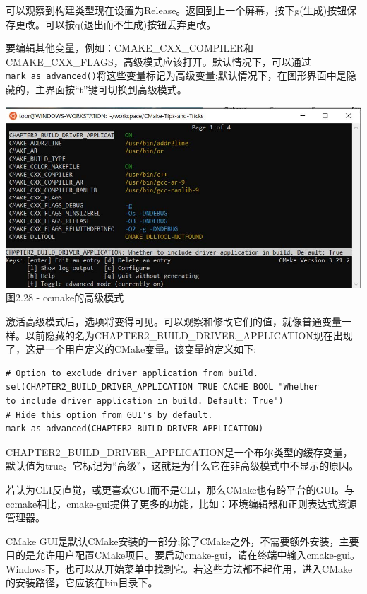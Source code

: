 可以观察到构建类型现在设置为Release。返回到上一个屏幕，按下g(生成)按钮保存更改。可以按q(退出而不生成)按钮丢弃更改。

要编辑其他变量，例如：CMAKE\_CXX\_COMPILER和CMAKE\_CXX\_FLAGS，高级模式应该打开。默认情况下，可以通过\texttt{mark\_as\_advanced()}将这些变量标记为高级变量;默认情况下，在图形界面中是隐藏的，主界面按“t”键可切换到高级模式。

\begin{center}
\includegraphics[width=1.\textwidth]{content/1/chapter2/images/28.jpg}\\
图2.28 - ccmake的高级模式
\end{center}

激活高级模式后，选项将变得可见。可以观察和修改它们的值，就像普通变量一样。以前隐藏的名为CHAPTER2\_BUILD\_DRIVER\_APPLICATION现在出现了，这是一个用户定义的CMake变量。该变量的定义如下:

\begin{lstlisting}[style=styleCMake]
# Option to exclude driver application from build.
set(CHAPTER2_BUILD_DRIVER_APPLICATION TRUE CACHE BOOL "Whether
to include driver application in build. Default: True")
# Hide this option from GUI's by default.
mark_as_advanced(CHAPTER2_BUILD_DRIVER_APPLICATION)
\end{lstlisting}

CHAPTER2\_BUILD\_DRIVER\_APPLICATION是一个布尔类型的缓存变量，默认值为true。它标记为“高级”，这就是为什么它在非高级模式中不显示的原因。


若认为CLI反直觉，或更喜欢GUI而不是CLI，那么CMake也有跨平台的GUI。与ccmake相比，cmake-gui提供了更多的功能，比如：环境编辑器和正则表达式资源管理器。

CMake GUI是默认CMake安装的一部分;除了CMake之外，不需要额外安装，主要目的是允许用户配置CMake项目。要启动cmake-gui，请在终端中输入cmake-gui。Windows下，也可以从开始菜单中找到它。若这些方法都不起作用，进入CMake的安装路径，它应该在bin目录下。

